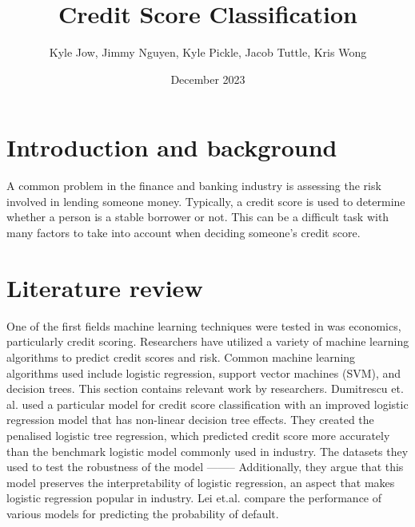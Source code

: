 \documentclass{article}
\title{\textbf{Credit Score Classification}}
\author{Kyle Jow, Jimmy Nguyen, Kyle Pickle, Jacob Tuttle, Kris Wong}
\date{December 2023}
\begin{document}
\maketitle
\newpage
{}
\pagestyle{fancy}
\fancyhf{} %
\fancyfoot[R]{\thepage}
\section*{Introduction and background}
A common problem in the finance and banking industry is assessing the risk
involved in lending someone money. Typically, a credit score is used to determine
whether a person is a stable borrower or not. This can be a difficult task with
many factors to take into account when deciding someone's credit score.
\newpage
\section*{Literature review}
One of the first fields machine learning techniques were tested in was economics,
particularly credit scoring. Researchers have utilized a variety of machine learning
algorithms to predict credit scores and risk. Common machine learning algorithms
used include logistic regression, support vector machines (SVM), and decision trees.
This section contains relevant work by researchers.
\vspace{5mm}\newline
Dumitrescu et. al. used a particular model for credit score classification with an 
improved logistic regression model that has non-linear decision tree effects. They created 
the penalised logistic tree regression, which predicted credit score 
more accurately than the benchmark logistic model commonly used in industry. The
datasets they used to test the robustness of the model --------
Additionally, they argue that this model preserves the interpretability of 
logistic regression, an aspect that makes logistic regression popular in industry. 
Lei et.al. compare the performance of various models for predicting the probability 
of default. 

\newpage
\end{document}
